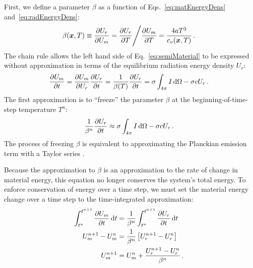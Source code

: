 First, we define a parameter $\beta$ as a function of
Eqs.~\eqref{eq:matEnergyDens} and~\eqref{eq:radEnergyDens}:
\begin{equation} \label{eq:beta}
  \beta(\bm{x}, T) \equiv \frac{\partial U_r}{\partial U_m} 
  = \frac{\partial U_r}{\partial T} \Bigg/ \frac{\partial U_m}{\partial T}
  = \frac{4 a T^3}{c_v(\bm{x}, T)} \,.
\end{equation}
The chain rule allows the left hand side of Eq.~\eqref{eq:semiMaterial} to be
expressed without approximation in terms of the equilibrium radiation energy
density $U_r$:
\begin{equation*}
  \frac{\partial U_m}{\partial t} = \frac{\partial U_m}{\partial U_r} \frac{\partial U_r}{\partial t} = \frac{1}{\beta(T)}
  \frac{\partial U_r}{\partial t} = \sigma \int_{4\pi}  I \mathop{}\!\mathrm{d} \Omega - \sigma c U_r \,.
\end{equation*}
The first approximation is to ``freeze'' the parameter $\beta$ at the beginning-of-time-step temperature $T^n$:
\begin{equation}\label{eq:frozenBeta}
  \frac{1}{\beta^n}
  \frac{\partial U_r}{\partial t} \approx \sigma \int_{4\pi}  I \mathop{}\!\mathrm{d} \Omega - \sigma c U_r \,.
\end{equation}
The process of freezing $\beta$ is equivalent to approximating the
Planckian emission term with a Taylor series \cite{Kno2007}.

Because the approximation to $\beta$ is an approximation to the rate of change
in material energy, this equation no longer conserves the system's total
energy. To enforce conservation of energy over a time step, we must set the
material energy change over a time step to the time-integrated approximation:
\begin{align}
  \nonumber
  \int_{t^n}^{t^{n+1}}  \frac{\partial U_m}{\partial t}\mathop{}\!\mathrm{d} t &= \frac{1}{\beta^n}
  \int_{t^n}^{t^{n+1}} \frac{\partial U_r}{\partial t}\mathop{}\!\mathrm{d} t
  \\
  \nonumber
  U_m^{n+1} - U_m^n &= \frac{1}{\beta^n} \left[ U_r^{n+1} - U_r^n \right]
  \\
  \label{eq:matenConservationUpdate}
  U_m^{n+1} &=  U_m^n + \frac{U_r^{n+1} - U_r^n}{\beta^n}\,.
\end{align}

